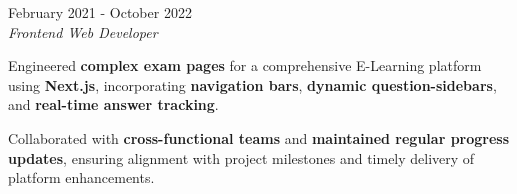 \documentclass[../main.tex]{subfiles}
\begin{document}
\vspace{0.4 cm}

\begin{twocolentry}{February 2021 - October 2022}
     \\
    \vspace{0.10 cm}
    \textit{Frontend Web Developer}
\end{twocolentry}

\vspace{0.10 cm}
\begin{onecolentry}
\begin{highlights}
    \item Engineered \textbf{complex exam pages} for a comprehensive E-Learning platform using \textbf{Next.js}, incorporating \textbf{navigation bars}, \textbf{dynamic question-sidebars}, and \textbf{real-time answer tracking}.
    \item Collaborated with \textbf{cross-functional teams} and \textbf{maintained regular progress updates}, ensuring alignment with project milestones and timely delivery of platform enhancements.
\end{highlights}
\end{onecolentry}
\end{document}
